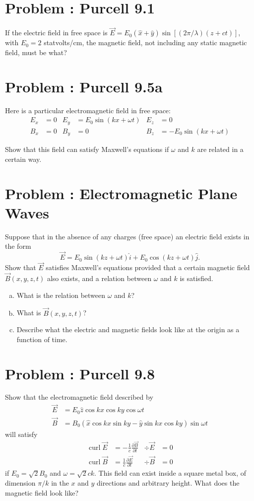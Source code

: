 \documentclass[problems]{esg8022pset}
\DeclareMathOperator{\curl}{curl}
\begin{document}
\section{Problem \thesection: Purcell 9.1}
  If the electric field in free space is $\vec E = E_0(\hat x + \hat y)\sin\left[(2\pi / \lambda)(z + ct)\right]$,
  with $E_0 = 2$ statvolts/cm, the magnetic field, not
  including any static magnetic field, must be what?
\section{Problem \thesection: Purcell 9.5a}
  Here is a particular electromagnetic field in free space:
  \begin{align*}
    E_x & = 0  &
      E_y & = E_0 \sin(kx + \omega t) &
      E_z & = 0 \\
    B_x & = 0 &
      B_y & = 0 &
      B_z & = -E_0\sin(kx + \omega t)
  \end{align*}

  \noindent Show that this field can satisfy Maxwell's equations if $\omega$ and
  $k$ are related in a certain way.
\section{Problem \thesection: Electromagnetic Plane Waves}
  Suppose that in the absence of any charges (free
  space) an electric field exists in the form
  $$\vec E = E_0\sin(kz + \omega t) \hat i + E_0 \cos(kz + \omega t) \hat j.$$
  Show that $\vec E$ satisfies Maxwell's equations provided that a certain magnetic field $\vec B(x,y,z,t)$
  also exists, and a relation between $\omega$ and $k$ is satisfied.
  \begin{enumerate}[(a)]
    \item What is the relation between $\omega$ and $k$?
    \item What is $\vec B(x,y,z,t)$?
    \item Describe what the electric and magnetic fields look like at the origin as a function of
    time.
  \end{enumerate}
\section{Problem \thesection: Purcell 9.8}
  Show that the electromagnetic field described by
  \begin{align*}
    \vec E & = E_0 \hat z \cos kx \cos ky \cos \omega t \\
    \vec B & = B_0(\hat x \cos kx \sin ky - \hat y \sin kx \cos ky) \sin \omega t
  \end{align*}
  will satisfy
  \begin{align*}
    \curl \vec E & = -\frac{1}{c}\frac{\partial \vec B}{\partial t} &
      \div\vec E & = 0 \\
    \curl \vec B & = \frac{1}{c}\frac{\partial \vec E}{\partial t} &
      \div\vec B & = 0
  \end{align*}
  if $E_0 = \sqrt{2}B_0$ and $\omega = \sqrt{2}ck$. This field can exist
  inside a square metal box, of dimension $\pi / k$ in the $x$ and $y$ directions
  and arbitrary height. What does the magnetic field look like?
\end{document}
